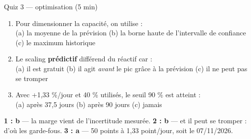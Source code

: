 \begin{frame}{Quiz 3 --- optimisation (5 min)}
\begin{qbox}[3 questions]
\begin{enumerate}
\item Pour dimensionner la capacité, on utilise :\\
(a) la moyenne de la prévision \quad (b) la borne haute de l'intervalle
de confiance \quad (c) le maximum historique
\item Le scaling \textbf{prédictif} différend du réactif car :\\
(a) il est gratuit \quad (b) il agit \emph{avant} le pic grâce à la
prévision \quad (c) il ne peut pas se tromper
\item Avec +1,33 \%/jour et 40 \% utilisés, le seuil 90 \% est atteint :\\
(a) après 37,5 jours \quad (b) après 90 jours \quad (c) jamais
\end{enumerate}
\end{qbox}
\vspace{1mm}
\begin{solbox}[Réponses]
\textbf{1 : b} --- la marge vient de l'incertitude mesurée.
\quad \textbf{2 : b} --- et il peut se tromper : d'où les garde-fous.
\quad \textbf{3 : a} --- 50 points à 1,33 point/jour, soit le
07/11/2026.
\end{solbox}
\end{frame}
